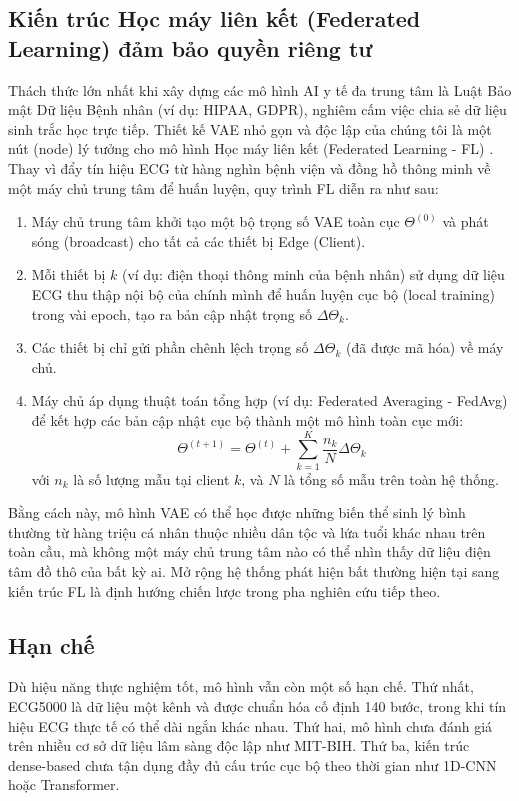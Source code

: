 \documentclass[conference]{IEEEtran}
\begin{document}
\subsection{Kiến trúc Học máy liên kết (Federated Learning) đảm bảo quyền riêng tư}
Thách thức lớn nhất khi xây dựng các mô hình AI y tế đa trung tâm là Luật Bảo mật Dữ liệu Bệnh nhân (ví dụ: HIPAA, GDPR), nghiêm cấm việc chia sẻ dữ liệu sinh trắc học trực tiếp. Thiết kế VAE nhỏ gọn và độc lập của chúng tôi là một nút (node) lý tưởng cho mô hình Học máy liên kết (Federated Learning - FL) \cite{federated_learning_ecg}. 
Thay vì đẩy tín hiệu ECG từ hàng nghìn bệnh viện và đồng hồ thông minh về một máy chủ trung tâm để huấn luyện, quy trình FL diễn ra như sau:
\begin{enumerate}
    \item Máy chủ trung tâm khởi tạo một bộ trọng số VAE toàn cục $\Theta^{(0)}$ và phát sóng (broadcast) cho tất cả các thiết bị Edge (Client).
    \item Mỗi thiết bị $k$ (ví dụ: điện thoại thông minh của bệnh nhân) sử dụng dữ liệu ECG thu thập nội bộ của chính mình để huấn luyện cục bộ (local training) trong vài epoch, tạo ra bản cập nhật trọng số $\Delta \Theta_k$.
    \item Các thiết bị chỉ gửi phần chênh lệch trọng số $\Delta \Theta_k$ (đã được mã hóa) về máy chủ.
    \item Máy chủ áp dụng thuật toán tổng hợp (ví dụ: Federated Averaging - FedAvg) để kết hợp các bản cập nhật cục bộ thành một mô hình toàn cục mới:
    \begin{equation}
    \Theta^{(t+1)} = \Theta^{(t)} + \sum_{k=1}^K \frac{n_k}{N} \Delta \Theta_k
    \end{equation}
    với $n_k$ là số lượng mẫu tại client $k$, và $N$ là tổng số mẫu trên toàn hệ thống.
\end{enumerate}
Bằng cách này, mô hình VAE có thể học được những biến thể sinh lý bình thường từ hàng triệu cá nhân thuộc nhiều dân tộc và lứa tuổi khác nhau trên toàn cầu, mà không một máy chủ trung tâm nào có thể nhìn thấy dữ liệu điện tâm đồ thô của bất kỳ ai. Mở rộng hệ thống phát hiện bất thường hiện tại sang kiến trúc FL là định hướng chiến lược trong pha nghiên cứu tiếp theo.

\subsection{Hạn chế}
Dù hiệu năng thực nghiệm tốt, mô hình vẫn còn một số hạn chế. Thứ nhất, ECG5000 là dữ liệu một kênh và được chuẩn hóa cố định 140 bước, trong khi tín hiệu ECG thực tế có thể dài ngắn khác nhau. Thứ hai, mô hình chưa đánh giá trên nhiều cơ sở dữ liệu lâm sàng độc lập như MIT-BIH. Thứ ba, kiến trúc dense-based chưa tận dụng đầy đủ cấu trúc cục bộ theo thời gian như 1D-CNN hoặc Transformer.
\end{document}
